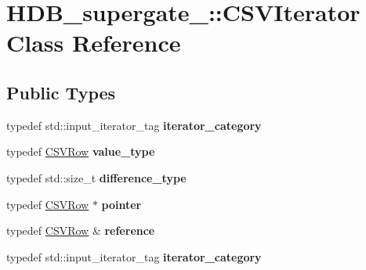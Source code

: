 \hypertarget{classHDB__supergate___1_1CSVIterator}{}\section{H\+D\+B\+\_\+supergate\+\_\+\+:\+:C\+S\+V\+Iterator Class Reference}
\label{classHDB__supergate___1_1CSVIterator}
\subsection*{Public Types}
\begin{DoxyCompactItemize}
\item 
\mbox{\label{classHDB__supergate___1_1CSVIterator_a0c208bb9b2dac061e45a1ffff4d62dde}} 
typedef std\+::input\+\_\+iterator\+\_\+tag {\bfseries iterator\+\_\+category}
\item 
\mbox{\label{classHDB__supergate___1_1CSVIterator_aa00df768a512ffadb0db78e731024b0e}} 
typedef \hyperlink{classHDB__supergate___1_1CSVRow}{C\+S\+V\+Row} {\bfseries value\+\_\+type}
\item 
\mbox{\label{classHDB__supergate___1_1CSVIterator_aa07aa8d7e1b2a9681deecf7f9db0282d}} 
typedef std\+::size\+\_\+t {\bfseries difference\+\_\+type}
\item 
\mbox{\label{classHDB__supergate___1_1CSVIterator_a3ed3f8491a7e0deabdc186240fb52034}} 
typedef \hyperlink{classHDB__supergate___1_1CSVRow}{C\+S\+V\+Row} $\ast$ {\bfseries pointer}
\item 
\mbox{\label{classHDB__supergate___1_1CSVIterator_a8aeeead4d142befeaf3c6deaf4a61e25}} 
typedef \hyperlink{classHDB__supergate___1_1CSVRow}{C\+S\+V\+Row} \& {\bfseries reference}
\item 
\mbox{\label{classHDB__supergate___1_1CSVIterator_a0c208bb9b2dac061e45a1ffff4d62dde}} 
typedef std\+::input\+\_\+iterator\+\_\+tag {\bfseries iterator\+\_\+category}
\item 
\mbox{\label{classHDB__supergate___1_1CSVIterator_aa00df768a512ffadb0db78e731024b0e}} 

\end{DoxyCompactItemize}
